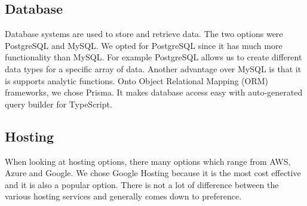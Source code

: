 \documentclass[hidelinks, 12pt, a4paper]{article}
\begin{document}
\subsection{Database}
Database systems are used to store and retrieve data.
The two options were PostgreSQL and MySQL.
We opted for PostgreSQL since it has much more functionality than MySQL.
For example PostgreSQL allows us to create different data types for a specific array of data.
Another advantage over MySQL is that it is supports analytic functions.
\newline
\newline
Onto Object Relational Mapping (ORM) frameworks, we chose Prisma.
It makes database access easy with auto-generated query builder for TypeScript.
\subsection{Hosting}
When looking at hosting options, there many options which range from AWS, Azure and Google.
We chose Google Hosting because it is the most cost effective and it is also a popular option.
There is not a lot of difference between the various hosting services and generally comes down to preference.
\newpage
\end{document}
